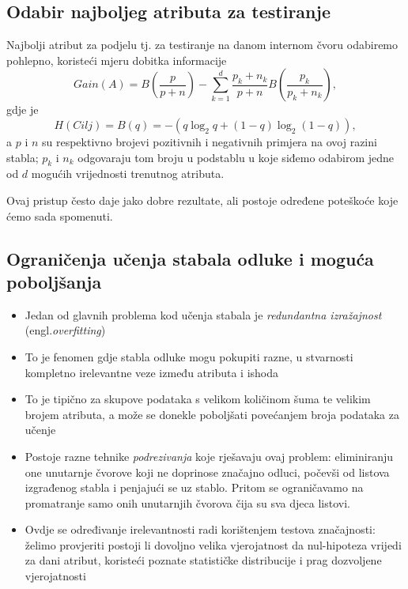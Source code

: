 \documentclass{beamer}
\begin{document}
\subsection{Odabir najboljeg atributa za testiranje}
\begin{frame}
Najbolji atribut za podjelu tj. za testiranje na danom internom čvoru odabiremo pohlepno, koristeći mjeru dobitka informacije
\begin{equation}
        \label{gaineq}
        Gain(A)=B\left(\frac{p}{p+n}\right)-\sum^d_{k=1}\frac{p_k+n_k}{p+n}B(\frac{p_k}{p_k+n_k}),
    \end{equation}
    gdje je 
    \begin{equation*}
        H(Cilj)=B(q)=-(q\log_2q+(1-q)\log_2(1-q)),
    \end{equation*}
a $p$ i $n$ su respektivno brojevi pozitivnih i negativnih primjera na ovoj razini stabla; $p_k$ i $n_k$ odgovaraju tom broju u podstablu
u koje siđemo odabirom jedne od $d$ mogućih vrijednosti trenutnog atributa.

Ovaj pristup često daje jako dobre rezultate, ali postoje određene poteškoće koje ćemo
sada spomenuti.
\end{frame}

\subsection{Ograničenja učenja stabala odluke i moguća poboljšanja}
\begin{frame}
    \begin{itemize}
        \item Jedan od glavnih problema kod učenja stabala je \emph{redundantna izražajnost} (engl.\textit{overfitting})
        \item To je fenomen gdje stabla odluke mogu pokupiti razne,
u stvarnosti kompletno irelevantne veze između atributa i ishoda
\item To je tipično za skupove podataka s velikom količinom šuma te
velikim brojem atributa, a može se donekle poboljšati povećanjem broja podataka za učenje 
\item Postoje razne tehnike \emph{podrezivanja} koje rješavaju ovaj problem: eliminiranju
 one unutarnje čvorove koji ne doprinose značajno odluci, počevši od listova izgrađenog stabla i penjajući
se uz stablo. Pritom se ograničavamo na promatranje samo onih unutarnjih čvorova čija su sva djeca listovi.
\item Ovdje se određivanje irelevantnosti radi korištenjem testova značajnosti: želimo provjeriti postoji li dovoljno
velika vjerojatnost da nul-hipoteza vrijedi za dani atribut, koristeći poznate statističke distribucije i prag dozvoljene
vjerojatnosti
    \end{itemize}
\end{frame}
\end{document}
